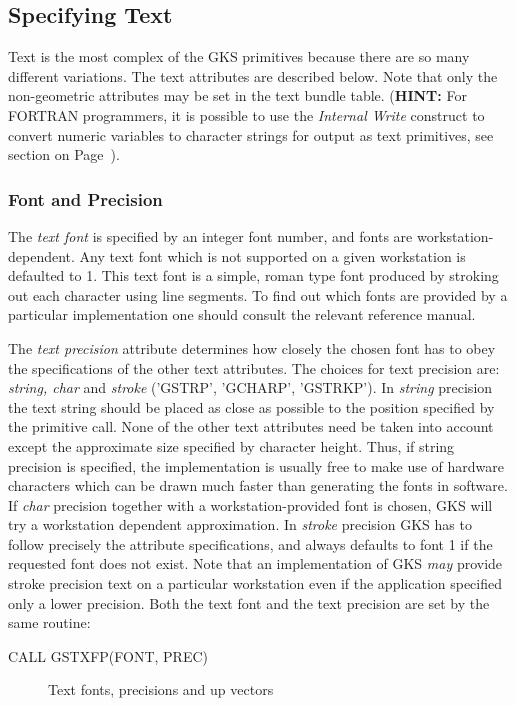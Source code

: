 \subsection{Specifying Text}
 
Text is the most complex of the GKS primitives because there are
so many different variations. The text attributes are described below.
Note that only the non-geometric attributes may be set in the text
bundle table.
({\bf HINT:} For FORTRAN programmers, it is possible to use the
{\it Internal Write} construct to convert numeric variables to character
strings for output as text primitives, see section on Page~\pageref{sec:refintw}).
\subsubsection{Font and Precision}
 
The {\it text font} is specified by an integer font number,
and fonts are workstation-dependent.
Any text font which is not supported on a given workstation is defaulted
to 1. This text font is a simple, roman type font produced by stroking
out each character using line segments.
To find out which fonts are provided by a particular implementation
one should consult the relevant reference manual.
 
The {\it text precision} attribute determines how closely the chosen
font has to obey the specifications of the other text attributes.
The choices for text precision are:
{\it string, char} and {\it stroke}
('GSTRP', 'GCHARP', 'GSTRKP').
In {\it string} precision the text string should be placed as close
as possible to the position specified by the primitive call.
None of the other text attributes need be taken into account
except the approximate size specified by character height.
Thus, if string precision is specified, the implementation is usually free
to make use of hardware characters which can be drawn much faster than
generating the fonts in software.
If {\it char} precision together with a workstation-provided font is
chosen, GKS will try a workstation dependent approximation.
In {\it stroke} precision GKS has to follow precisely the attribute
specifications, and always defaults to font 1
if the requested font does not exist.
Note that an implementation of GKS {\it may} provide stroke precision
text on a particular workstation even if the application specified only
a lower precision.
Both the text font and the text precision are set by the same routine:
\begin{XMP}
CALL GSTXFP(FONT, PREC)
\end{XMP}
\begin{figure}[h]
\caption{Text fonts, precisions and up vectors}
\label{fig:fonts}
\end{figure}
